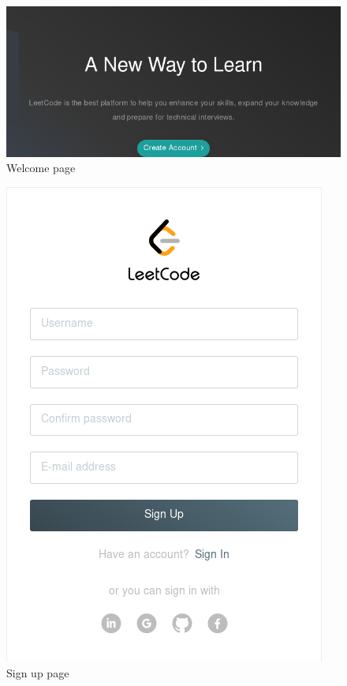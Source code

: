 \documentclass[12pt, letterpaper]{article}
\begin{document}
\begin{figure}
    \includegraphics[width=\linewidth]{img/L1.png}
    \caption{Welcome page}
    \label{fig:L1}
\end{figure}
\begin{figure}
    \includegraphics[width=\linewidth]{img/L2.png}
    \caption{Sign up page}
    \label{fig:L1}
\end{figure}
\end{document}

